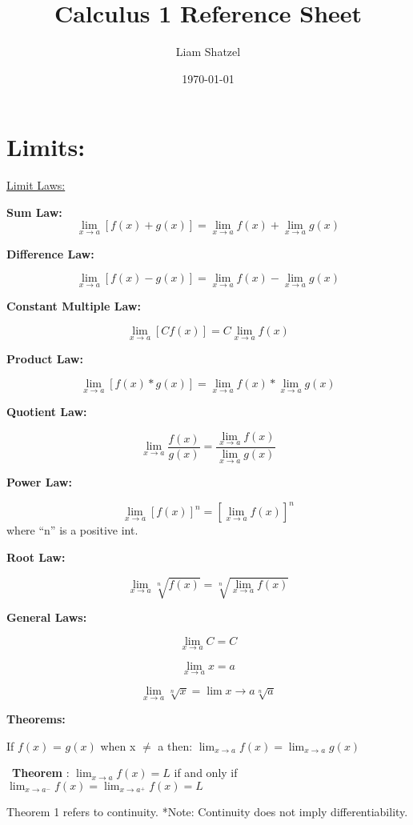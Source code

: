 \documentclass[fleqn]{article}
\title{Calculus 1 Reference Sheet}
\author{Liam Shatzel}
\date{\today}
\begin{document}
\begin{titlepage}
\maketitle
\end{titlepage}


\section*{Limits:}
\underline{Limit Laws:}\par
\textbf{Sum Law: } 
\[\lim_{x\to a}[f(x)+g(x)] = \lim_{x\to a}f(x) + \lim_{x \to a}g(x)\]

\textbf{Difference Law: } 

\[\lim_{x\to a}[f(x)-g(x)] = \lim_{x\to a}f(x) - \lim_{x \to a}g(x)\]

\textbf{Constant Multiple Law: } 

\[\lim_{x\to a}[Cf(x)] = C\lim_{x\to a}f(x)\]

\textbf{Product Law: } 

\[\lim_{x\to a}[f(x)*g(x)] = \lim_{x\to a}f(x) * \lim_{x \to a}g(x)\]

\textbf{Quotient Law: } 

\[\lim_{x\to a}\frac{f(x)}{g(x)} = \frac{\lim_{x\to a}f(x)}{\lim_{x \to a}g(x)}\]

\textbf{Power Law: } 

\[\lim_{x\to a}[f(x)]^n = [\lim_{x\to a}f(x)]^n\] where “n” is a positive int. 


\textbf{Root Law: } 

\[\lim_{x\to a}\sqrt[n]{f(x)}= \sqrt[n]{\lim_{x\to a}f(x)}\]

\textbf{General Laws: } 

\[\lim_{x\to a}{C} = {C}\]

\[\lim_{x\to a}{x} = {a}\]

\[\lim_{x\to a}\sqrt[n]{x} = \lim{x\to a}\sqrt[n]{a}\]

\textbf{Theorems: }
\break

If $f(x)$ = $g(x)$ when x $\neq$ a then: $\displaystyle\lim_{x\to a}{f(x)} = \lim_{x\to a}{g(x)}$

\
\textbf{Theorem}  : $\displaystyle\lim_{x\to a}{f(x)} = L$ if and only if $\displaystyle\lim_{x\to a^-}{f(x)} = \lim_{x\to a^+}{f(x)} = L$ 
\newline

Theorem 1 refers to continuity. *Note: Continuity does not imply differentiability. 
\break
\end{document}
